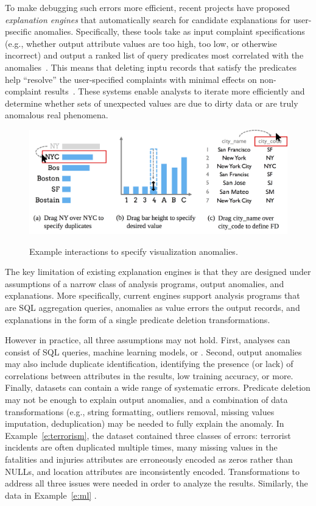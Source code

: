 To make debugging such errors more efficient, recent projects have proposed \emph{explanation engines} that automatically search for candidate explanations for user-psecific anomalies.  Specifically, these tools take as input complaint specifications (e.g., whether output attribute values are too high, too low, or otherwise incorrect) and output a ranked list of query predicates most correlated with the anomalies~\cite{scorpion,DBLP:conf/sigmod/ChalamallaIOP14,bailis2016macrobase,roy2015explaining}.  This means that deleting inptu records that satisfy the predicates help ``resolve'' the user-specified complaints with minimal effects on non-complaint results~\cite{scorpion}.  These systems enable analysts to iterate more efficiently and determine whether sets of unexpected values are due to dirty data or are truly anomalous real phenomena.

\begin{figure}[tb]
\centering
\includegraphics[width=\columnwidth]{figures/ui.png}
\label{f:ui}
\caption{Example interactions to specify visualization anomalies.}
\end{figure}


The key limitation of existing explanation engines is that they are designed under assumptions of a narrow class of  analysis programs, output anomalies, and explanations.  More specifically, current engines support analysis programs that are SQL aggregation queries, anomalies as value errors the output records, and explanations in the form of a single predicate deletion transformations.  

However in practice, all three assumptions may not hold.  First, analyses can consist of SQL queries, machine learning models, or .  Second, output anomalies may also include duplicate identification, identifying the presence (or lack) of correlations between attributes in the results, low training accuracy, or more.    Finally, datasets can contain a wide range of systematic errors.   Predicate deletion may not be enough to explain output anomalies, and a combination of data transformations (e.g., string formatting, outliers removal, missing values imputation, deduplication) may be needed to fully explain the anomaly.  In Example~\ref{e:terrorism}, the dataset contained three classes of errors: terrorist incidents are often duplicated multiple times, many missing values in the fatalities and injuries attributes are erroneously encoded as zeros rather than NULLs, and location attributes are inconsistently encoded.   Transformations to address all three issues were needed in order to analyze the results.  Similarly, the data in Example~\ref{e:ml} .



